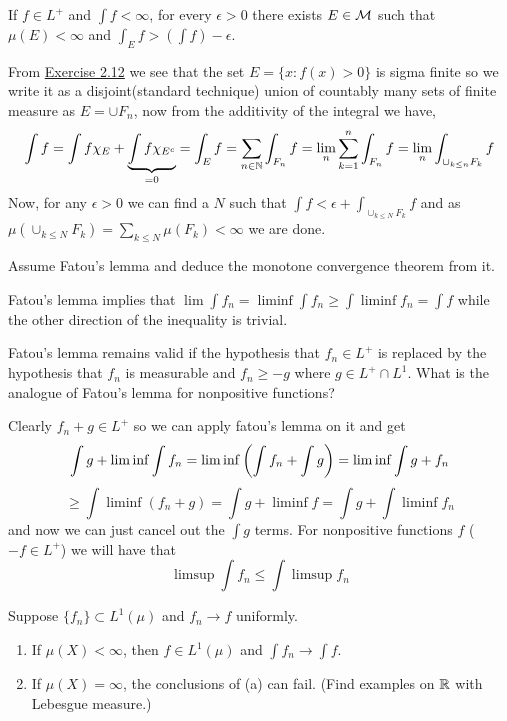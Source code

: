 \documentclass[12pt,a4paper]{article}
\begin{document}
\begin{problem}\label{prob:2-16}
If $f \in L^+$ and $\int f < \infty$, for every $\epsilon > 0$ there exists $E \in \mathcal{M}$ such that $\mu(E) < \infty$ and $\int_E f > (\int f) - \epsilon$.
\end{problem}
\begin{solution}
From \hyperref[prob:2-12]{Exercise 2.12} we see that the set $E=\{x:f(x)>0\}$ is sigma finite so we write it as a disjoint(standard technique) union of countably many sets of finite measure as $E=\cup F_n$, now from the additivity of the integral we have, 
$$\int f=\int f\chi_E+\underbrace{\int f\chi_{E^c}}_{=0}=\int_E f=\sum_{n\in\mathbb{N}}\int_{F_n}f=\lim_{n}\sum_{k=1}^n\int_{F_n}f=\lim_n\int_{\cup_{k\leq n}F_k}f$$ 
Now, for any $\epsilon>0$ we can find a $N$ such that $\int f<\epsilon+\int_{\cup_{k\leq N}F_k}f$ and as $\mu(\cup_{k\leq N}F_k)=\sum_{k\leq N}\mu(F_k)<\infty$ we are done. 
\end{solution}
\begin{problem}\label{prob:2-17}
Assume Fatou's lemma and deduce the monotone convergence theorem from it.
\end{problem}
\begin{solution}
    Fatou's lemma implies that $\lim\int f_n=\liminf\int f_n\geq\int\liminf f_n=\int f$ while the other direction of the inequality is trivial. 
\end{solution}
\begin{problem}\label{prob:2-18}
Fatou's lemma remains valid if the hypothesis that $f_n \in L^+$ is replaced by the hypothesis that $f_n$ is measurable and $f_n \ge -g$ where $g \in L^+ \cap L^1$. What is the analogue of Fatou's lemma for nonpositive functions?
\end{problem}
\begin{solution}
Clearly $f_n+g\in L^+$ so we can apply fatou's lemma on it and get
$$\int g+\liminf\int f_n=\liminf\qty(\int f_n+\int g)=\liminf\int g+f_n$$
$$\geq\int\liminf(f_n+g)=\int g+\liminf f=\int g+\int \liminf f_n$$
and now we can just cancel out the $\int g$ terms. 
For nonpositive functions $f$ ($-f\in L^+$) we will have that
$$\limsup\int f_n\leq\int\limsup f_n$$
\end{solution}
\begin{problem}\label{prob:2-19}
Suppose $\{f_n\} \subset L^1(\mu)$ and $f_n \to f$ uniformly.
\begin{enumerate}[label=\alph*.]
    \item If $\mu(X) < \infty$, then $f \in L^1(\mu)$ and $\int f_n \to \int f$.
    \item If $\mu(X) = \infty$, the conclusions of (a) can fail. (Find examples on $\mathbb{R}$ with Lebesgue measure.)
\end{enumerate}
\end{problem}
\end{document}
